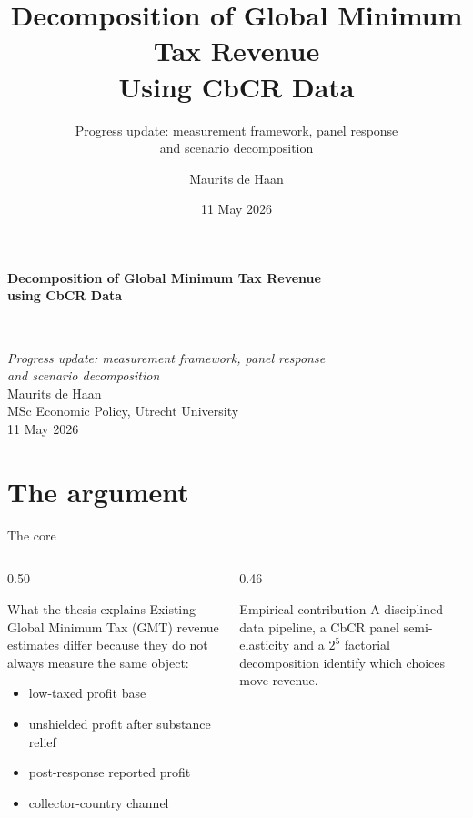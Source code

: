 \documentclass[aspectratio=169, 11pt]{beamer}
\title{Decomposition of Global Minimum Tax Revenue\\Using CbCR Data}
\subtitle{Progress update: measurement framework, panel response\\and scenario decomposition}
\author{Maurits de Haan}
\institute{MSc Economic Policy\\ Utrecht University School of Economics}
\date{11 May 2026}
\begin{document}
{
\begin{frame}[plain]
  \vspace{1.6em}
  \begin{center}
    {\color{Ivory}\Large\bfseries Decomposition of Global Minimum Tax Revenue}\\[0.3em]
    {\color{Ivory}\Large\bfseries using CbCR Data}\\[0.8em]
    {\color{DkOrange}\rule{6cm}{2pt}}\\[0.8em]
    {\color{LtOrange}\normalsize\itshape Progress update: measurement framework, panel response\\[0.2em]
     and scenario decomposition}\\[1.8em]
    {\color{Ivory}\normalsize Maurits de Haan}\\[0.3em]
    {\color{WarmGrey}\small MSc Economic Policy, Utrecht University}\\[0.3em]
    {\color{MidGrey}\small 11 May 2026}
  \end{center}
\end{frame}
}

\section{The argument}

\begin{frame}{The core}
\small
\begin{columns}[T]
\begin{column}{0.50\textwidth}
\begin{block}{What the thesis explains}
  Existing Global Minimum Tax (GMT) revenue estimates differ because they do not always measure the same object:
  \begin{itemize}
    \item low-taxed profit base
    \item unshielded profit after substance relief
    \item post-response reported profit
    \item collector-country channel
  \end{itemize}
\end{block}
\end{column}
\begin{column}{0.46\textwidth}
\begin{exampleblock}{Empirical contribution}
  A disciplined data pipeline, a CbCR panel semi-elasticity and a $2^5$ factorial decomposition identify which choices move revenue.
\end{exampleblock}

\end{column}
\end{columns}
\end{frame}
\end{document}
